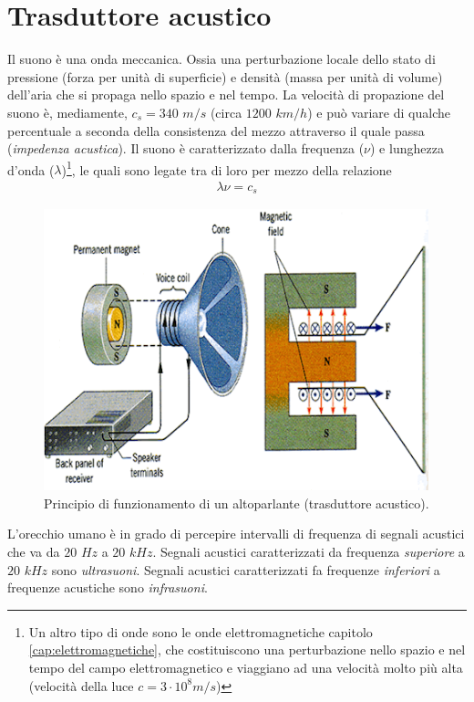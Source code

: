 \documentclass[17pt]{extarticle}
\begin{document}
\section{Trasduttore acustico}\label{par:OndaMeccanica}


Il suono è una onda meccanica. Ossia una perturbazione locale dello stato di pressione (forza per unità di superficie) e densità (massa per unità di volume) dell'aria che si propaga nello spazio e nel tempo. La velocità di propazione del suono è, mediamente, $c_s = 340$ $m/s$ (circa $1200$ $km/h$) e può variare di qualche percentuale a seconda della consistenza del mezzo attraverso il quale passa (\emph{impedenza acustica}). Il suono è caratterizzato dalla frequenza ($\nu$) e lunghezza d'onda ($\lambda$)\footnote{Un altro tipo di onde sono le onde elettromagnetiche capitolo \ref{cap:elettromagnetiche}, che costituiscono una perturbazione nello spazio e nel tempo del campo elettromagnetico e viaggiano ad una velocità molto più alta (velocità della luce $c = 3\cdot 10^8m/s$)}, le quali sono legate tra di loro per mezzo della relazione
\begin{eqnarray}
	\lambda \nu = c_s
\end{eqnarray}




\begin{figure}[t]
	\centering
   	\includegraphics[width=4.4in]{speakerMagneticField.png}%
  	\caption{Principio di funzionamento di un altoparlante (trasduttore acustico).}
   	\label{fig:trasduttoreSuono}
\end{figure}




L'orecchio umano è in grado di percepire intervalli di frequenza di segnali acustici che va da $20$ $Hz$ a $20$ $kHz$. Segnali acustici caratterizzati da frequenza \emph{superiore} a $20$ $kHz$ sono \emph{ultrasuoni}. Segnali acustici caratterizzati fa frequenze \emph{inferiori} a frequenze acustiche sono \emph{infrasuoni}. 
\end{document}

